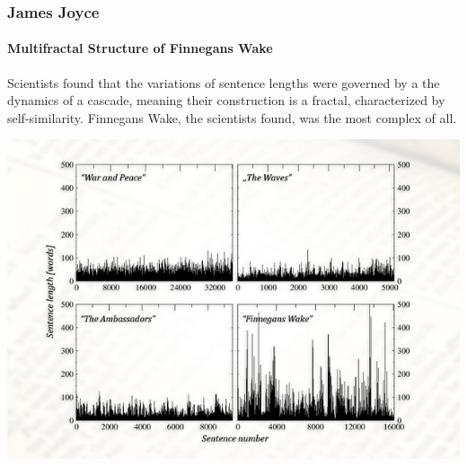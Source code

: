 \documentclass{beamer}
\begin{document}
		\begin{frame}
			\frametitle{James Joyce}
			\framesubtitle{Multifractal Structure of Finnegans Wake}
			Scientists found that the variations of sentence lengths were governed by a the dynamics of a cascade, meaning their construction is a fractal, characterized by self-similarity. Finnegans Wake, the scientists found, was the most complex of all.
			\begin{center}
				\includegraphics[width=0.7\linewidth]{"../Inglese - Joyce/fractal_graphic"}
			\end{center}

		\end{frame}
\end{document}
